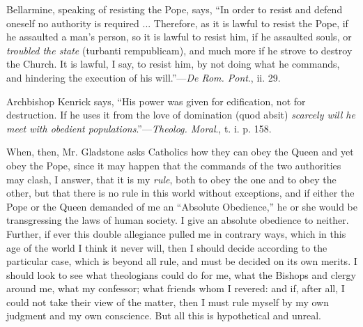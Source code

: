 Bellarmine, speaking of resisting the Pope, says, ``In
order to resist and defend oneself no authority is required ...
Therefore, as it is lawful to resist the Pope, if he assaulted a man's
person, so it is lawful to resist him, if he assaulted souls, or \emph{troubled
the state} (turbanti rempublicam), and much more if he strove to
destroy the Church. It is lawful, I say, to resist him, by not doing
what he commands, and hindering the execution of his will.''—\emph{De
Rom. Pont}., ii. 29.

Archbishop Kenrick says, ``His power was given for edification,
not for destruction. If he uses it from the love of domination (quod
absit) \emph{scarcely will he meet with obedient populations}.''—\emph{Theolog.
Moral}., t. i. p. 158.

When, then, Mr. Gladstone asks Catholics how they can obey the Queen
and yet obey the Pope, since it may happen that the commands of the two
authorities may clash, I answer, that it is my \emph{rule}, both to obey
the one and to obey the other, but that there is no rule in this world
without exceptions, and if either the Pope or the Queen demanded of me
an ``Absolute Obedience,'' he or she would be transgressing the
laws of human society. I give an absolute obedience to neither. Further,
if ever this double allegiance pulled me in contrary ways, which in this
age of the world I think it never will, then I should decide according
to the particular case, which is beyond all rule, and must be decided on
its own merits. I should look to see what theologians could do for me,
what the Bishops and clergy around me, what my confessor; what friends
whom I revered: and if, after all, I could not take their view of the matter, then I must rule myself by my own judgment and my own
conscience. But all this is hypothetical and unreal.

